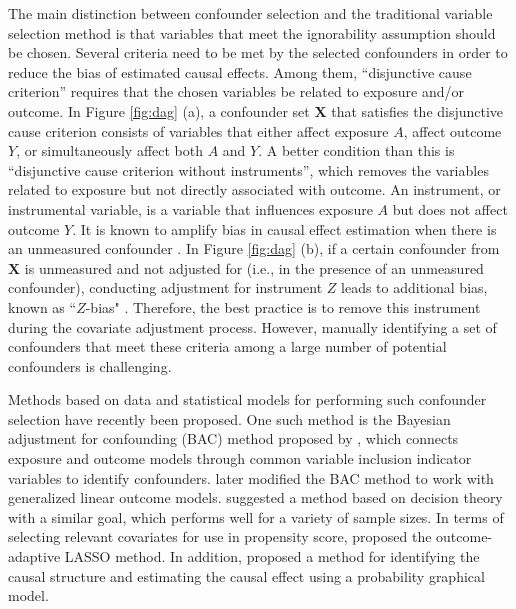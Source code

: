 The main distinction between confounder selection and the traditional variable selection method is that variables that meet the ignorability assumption should be chosen. Several criteria need to be met by the selected confounders in order to reduce the bias of estimated causal effects. Among them, ``disjunctive cause criterion''\citep{vanderweele2019principles} requires that the chosen variables be related to exposure and/or outcome. In Figure \ref{fig:dag} (a), a confounder set $\boldsymbol{X}$ that satisfies the disjunctive cause criterion consists of variables that either affect exposure $A$, affect outcome $Y$, or simultaneously affect both $A$ and $Y$. A better condition than this is ``disjunctive cause criterion without instruments''\citep{vanderweele2019principles}, which removes the variables related to exposure but not directly associated with outcome. An instrument, or instrumental variable, is a variable that influences exposure $A$ but does not affect outcome $Y$. It is known to amplify bias in causal effect estimation when there is an unmeasured confounder \citep{myers2011effects}. In Figure \ref{fig:dag} (b), if a certain confounder from $\boldsymbol{X}$ is unmeasured and not adjusted for (i.e., in the presence of an unmeasured confounder), conducting adjustment for instrument $Z$ leads to additional bias, known as ``$Z$-bias" \citep{ding2017instrumental}. Therefore, the best practice is to remove this instrument during the covariate adjustment process. However, manually identifying a set of confounders that meet these criteria among a large number of potential confounders is challenging.

Methods based on data and statistical models for performing such confounder selection have recently been proposed. One such method is the Bayesian adjustment for confounding (BAC) method proposed by \cite{wang2012bayesian,lefebvre2014extending}, which connects exposure and outcome models through common variable inclusion indicator variables to identify confounders. \cite{wang2015accounting} later modified the BAC method to work with generalized linear outcome models. \cite{wilson2014confounder} suggested a method based on decision theory with a similar goal, which performs well for a variety of sample sizes. In terms of selecting relevant covariates for use in propensity score, \cite{shortreed2017outcome} proposed the outcome-adaptive LASSO method. In addition, \cite{haggstrom2018data} proposed a method for identifying the causal structure and estimating the causal effect using a probability graphical model.

